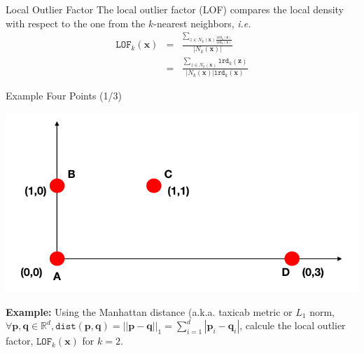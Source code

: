 \documentclass[10pt]{beamer}
\def\x{{\mathbf {x}}}
\newcommand{\vectorI}{\x}
\begin{document}
\begin{frame}{Local Outlier Factor}
The local outlier factor (LOF) compares the local density with respect to the one from the $k$-nearest neighbors, \emph{i.e.}
\begin{eqnarray*}
\texttt{LOF}_k(\vectorI)&=& \frac{\sum_{z \in N_{k}(\vectorI) \frac{\texttt{lrd}_k(\mathbf{z})}{{\texttt{lrd}_k(\vectorI)}}}}{|N_{k}(\vectorI)|} \\
&=& \frac{\sum_{z \in N_{k}(\vectorI)} \texttt{lrd}_k(\mathbf{z})}{|N_{k}(\vectorI)|\texttt{lrd}_k(\vectorI)}
\end{eqnarray*}
\end{frame}

\begin{frame}{Example Four Points (1/3)}
\begin{center}
\includegraphics[width=.75\textwidth]{ExampleFourPoints}
\end{center}
\textbf{Example:}
Using the Manhattan distance (a.k.a. taxicab metric or $L_1$ norm, $\forall \mathbf{p},\mathbf{q} \in \mathbb{R}^{d}, \texttt{dist}(\mathbf{p},\mathbf{q})=||\mathbf{p}-\mathbf{q}||_1=\sum_{i=1}^{d}|\mathbf{p}_i-\mathbf{q}_i|$, calcule the local outlier factor, $\texttt{LOF}_k(\vectorI)$ for $k=2$.
\end{frame}
\end{document}
